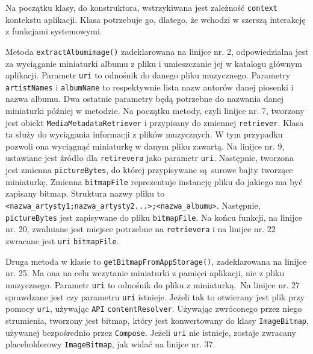 Na początku klasy, do konstruktora, wstrzykiwana jest zależność \texttt{context} kontekstu aplikacji. Klasa potrzebuje go, dlatego, że wchodzi w szerszą interakcję z funkcjami systemowymi.

Metoda \texttt{extractAlbumimage()} zadeklarowana na linijce nr. 2, odpowiedzialna jest za wyciąganie miniaturki albumu z pliku i umieszczanie jej w katalogu głównym aplikacji. Parametr \texttt{uri} to odnośnik do danego pliku muzycznego. Parametry \texttt{artistNames} i \texttt{albumName} to respektywnie lista nazw autorów danej piosenki i nazwa albumu. Dwa ostatnie parametry będą potrzebne do nazwania danej miniaturki później w metodzie. Na początku metody, czyli linijce nr. 7, tworzony jest obiekt \texttt{MediaMetadataRetriever} i przypisany do zmiennej \texttt{retriever}. Klasa ta służy do wyciągania informacji z plików muzycznych. W tym przypadku pozwoli ona wyciągnąć miniaturkę w danym pliku zawartą. Na linijce nr. 9, ustawiane jest źródło dla \texttt{retirevera} jako parametr \texttt{uri}. Następnie, tworzona jest  zmienna \texttt{pictureBytes}, do której przypisywane są surowe bajty tworzące miniaturkę. Zmienna \texttt{bitmapFile} reprezentuje instancję pliku do jakiego ma być zapisany bitmap. Struktura nazwy pliku to \texttt{<nazwa\_artysty1;nazwa\_artysty2...>;<nazwa\_albumu>}. Następnie, \texttt{pictureBytes} jest zapisywane do pliku \texttt{bitmapFile}. Na końcu funkcji, na linijce nr. 20, zwalniane jest miejsce potrzebne na \texttt{retrievera} i na linijce nr. 22 zwracane jest \texttt{uri} \texttt{bitmapFile}.

Druga metoda w klasie to \texttt{getBitmapFromAppStorage()}, zadeklarowana na linijce nr. 25. Ma ona na celu wczytanie miniaturki z pamięci aplikacji, nie z pliku muzycznego. Parametr \texttt{uri} to odnośnik do pliku z miniaturką. Na linijce nr. 27 sprawdzane jest czy parametru \texttt{uri} istnieje. Jeżeli tak to otwierany jest plik przy pomocy \texttt{uri}, używając \texttt{API} \texttt{contentResolver}. Używając zwróconego przez niego strumienia, tworzony jest bitmap, który jest konwertowany do klasy \texttt{ImageBitmap}, używanej bezpośrednio przez \texttt{Compose}. Jeżeli \texttt{uri} nie istnieje, zostaje zwracany placeholderowy \texttt{ImageBitmap}, jak widać na linijce nr. 37.

